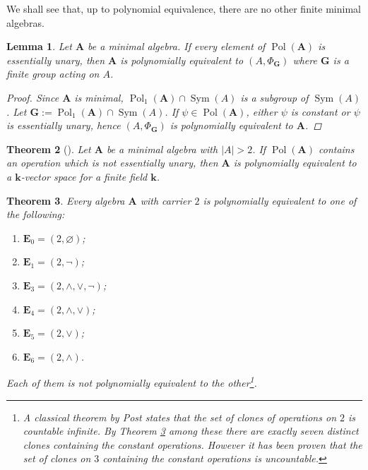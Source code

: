 \documentclass{amsart}
\theoremstyle{plain}
\newtheorem{theorem}{Theorem}[section]
\newtheorem{lemma}[theorem]{Lemma}
\theoremstyle{definition}
\theoremstyle{remark}
\DeclareMathOperator{\Pol}{Pol}
\DeclareMathOperator{\Sym}{Sym}
\begin{document}
We shall see that, up to polynomial equivalence, there are no other finite minimal algebras. 

\begin{lemma}
    Let $\mathbf{A}$ be a minimal algebra.
    If every element of $\Pol(\mathbf{A})$ is essentially unary, then $\mathbf{A}$ is polynomially equivalent to $(A, \Phi_{\mathbf{G}})$ where $\mathbf{G}$ is a finite group acting on $A$. 
    \begin{proof}
        Since $\mathbf{A}$ is minimal, $\Pol_1(\mathbf{A}) \cap \Sym(A)$ is a subgroup of $\Sym(A)$. 
        Let $\mathbf{G}:=\Pol_1(\mathbf{A}) \cap \Sym(A)$. 
        If $\psi \in \Pol(\mathbf{A})$, either $\psi$ is constant or $\psi$ is essentially unary, hence $(A, \Phi_{\mathbf{G}})$ is polynomially equivalent to $\mathbf{A}$. 
    \end{proof}
\end{lemma}

\begin{theorem}
    [\cite{classification-minimal}]
    Let $\mathbf{A}$ be a minimal algebra with $|A| > 2$.  
    If $\Pol(\mathbf{A})$ contains an operation which is not essentially unary, then $\mathbf{A}$ is polynomially equivalent to a $\mathbf{k}$-vector space for a finite field $\mathbf{k}$. 
\end{theorem}

\begin{theorem}
    \label{classification-two}
    Every algebra $\mathbf{A}$ with carrier $2$ is polynomially equivalent to one of the following: 
    \begin{enumerate}
        \item $\mathbf{E}_0= (2, \varnothing)$;
        \item $\mathbf{E}_1 = (2, \lnot)$; 
        \item $\mathbf{E}_3 = (2, \land, \lor, \lnot)$; 
        \item $\mathbf{E}_4 = (2, \land, \lor)$; 
        \item $\mathbf{E}_5 = (2, \lor)$; 
        \item $\mathbf{E}_6 = (2, \land)$.
    \end{enumerate}
    Each of them is not polynomially equivalent to the other\footnote{A classical theorem by Post states that the set of clones of operations on $2$ is countable infinite. 
    By Theorem \ref{classification-two} among these there are exactly seven distinct clones containing the constant operations.
    However it has been proven that the set of clones on $3$ containing the constant operations is uncountable.}.
\end{theorem}
\end{document}
